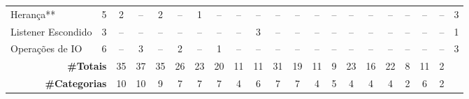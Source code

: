 \begin{table*}[t]
\begin{tabular}{@{}p{3.8cm}p{0.3cm}p{.2cm}p{.2cm}p{.2cm}p{.2cm}p{.2cm}p{.2cm}p{.2cm}p{.2cm}p{.2cm}p{.4cm}p{.4cm}p{.4cm}p{.4cm}p{.4cm}p{.4cm}p{.4cm}p{.4cm}p{.4cm}p{0.2cm}@{}}
Heran\c{c}a**								& \multicolumn{1}{c}{5} 	& \multicolumn{1}{c}{2} 	& \multicolumn{1}{c}{--} 	& \multicolumn{1}{c}{2} 	& \multicolumn{1}{c}{--} 	& \multicolumn{1}{c}{1} 	& \multicolumn{1}{c}{--} 	& \multicolumn{1}{c}{--} 	& \multicolumn{1}{c}{--} 	& \multicolumn{1}{c}{--} 	& \multicolumn{1}{c}{--} 	& \multicolumn{1}{c}{--} 	& \multicolumn{1}{c}{--} 	& \multicolumn{1}{c}{--} 	& \multicolumn{1}{c}{--} 	& \multicolumn{1}{c}{--} 	& \multicolumn{1}{c}{--} 	& \multicolumn{1}{c}{--} 	& \multicolumn{1}{c}{--} 	& \multicolumn{1}{c}{3} \\
Listener Escondido							& \multicolumn{1}{c}{3} 	& \multicolumn{1}{c}{--} 	& \multicolumn{1}{c}{--} 	& \multicolumn{1}{c}{--} 	& \multicolumn{1}{c}{--} 	& \multicolumn{1}{c}{--} 	& \multicolumn{1}{c}{--} 	& \multicolumn{1}{c}{--} 	& \multicolumn{1}{c}{3} 	& \multicolumn{1}{c}{--} 	& \multicolumn{1}{c}{--} 	& \multicolumn{1}{c}{--} 	& \multicolumn{1}{c}{--} 	& \multicolumn{1}{c}{--} 	& \multicolumn{1}{c}{--} 	& \multicolumn{1}{c}{--} 	& \multicolumn{1}{c}{--} 	& \multicolumn{1}{c}{--} 	& \multicolumn{1}{c}{--} 	& \multicolumn{1}{c}{1} \\
Opera\c{c}\~oes de IO							& \multicolumn{1}{c}{6} 	& \multicolumn{1}{c}{--} 	& \multicolumn{1}{c}{3} 	& \multicolumn{1}{c}{--} 	& \multicolumn{1}{c}{2} 	& \multicolumn{1}{c}{--} 	& \multicolumn{1}{c}{1} 	& \multicolumn{1}{c}{--} 	& \multicolumn{1}{c}{--} 	& \multicolumn{1}{c}{--} 	& \multicolumn{1}{c}{--} 	& \multicolumn{1}{c}{--} 	& \multicolumn{1}{c}{--} 	& \multicolumn{1}{c}{--} 	& \multicolumn{1}{c}{--} 	& \multicolumn{1}{c}{--} 	& \multicolumn{1}{c}{--} 	& \multicolumn{1}{c}{--} 	& \multicolumn{1}{c}{--} 	& \multicolumn{1}{c}{3} \\
\hline
\multicolumn{2}{r}{\textbf{\#Totais}}		& \multicolumn{1}{c}{35} 	& \multicolumn{1}{c}{37} 	& \multicolumn{1}{c}{35} 	& \multicolumn{1}{c}{26} 	& \multicolumn{1}{c}{23} 	& \multicolumn{1}{c}{20} 	& \multicolumn{1}{c}{11} 	& \multicolumn{1}{c}{11} 	& \multicolumn{1}{c}{31} 	& \multicolumn{1}{c}{19} 	& \multicolumn{1}{c}{11} 	& \multicolumn{1}{c}{9} 	& \multicolumn{1}{c}{23} 	& \multicolumn{1}{c}{16} 	& \multicolumn{1}{c}{22} 	& \multicolumn{1}{c}{8} 	& \multicolumn{1}{c}{11} 	& \multicolumn{1}{c}{2} \\
\hline
\multicolumn{2}{r}{\textbf{\#Categorias}}	& \multicolumn{1}{c}{10} 	& \multicolumn{1}{c}{10} 	& \multicolumn{1}{c}{9} 	& \multicolumn{1}{c}{7} 	& \multicolumn{1}{c}{7} 	& \multicolumn{1}{c}{7} 	& \multicolumn{1}{c}{4} 	& \multicolumn{1}{c}{6} 	& \multicolumn{1}{c}{7} 	& \multicolumn{1}{c}{7} 	& \multicolumn{1}{c}{4} 	& \multicolumn{1}{c}{5} 	& \multicolumn{1}{c}{4} 	& \multicolumn{1}{c}{4} 	& \multicolumn{1}{c}{4} 	& \multicolumn{1}{c}{2} 	& \multicolumn{1}{c}{6} 	& \multicolumn{1}{c}{2} \\

\end{tabular}
\end{table*}
